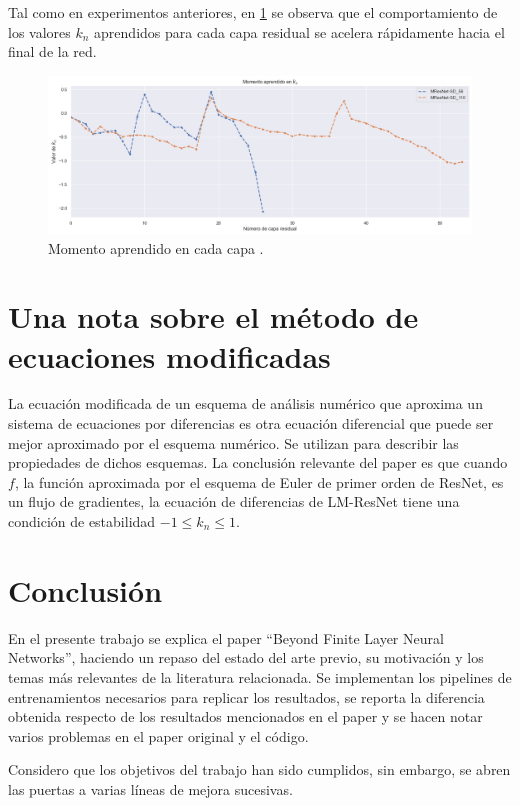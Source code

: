 \documentclass[titlepage,a4paper,oneside]{article}
\begin{document}
Tal como en experimentos anteriores, en \ref{sd_momentum} se observa que el comportamiento de los valores $k_n$ aprendidos para cada capa residual se acelera rápidamente hacia el final de la red.

\begin{figure}[H]
\centering
\includegraphics[width=\textwidth]{images/momentum_sd.png}
\caption{Momento aprendido en cada capa .}
\label{sd_momentum}
\end{figure}

\section{Una nota sobre el método de ecuaciones modificadas}
La ecuación modificada de un esquema de análisis numérico que aproxima un sistema de ecuaciones por diferencias es otra ecuación diferencial que puede ser mejor aproximado por el esquema numérico. Se utilizan para describir las propiedades de dichos esquemas. La conclusión relevante del paper es que cuando $f$, la función aproximada por el esquema de Euler de primer orden de ResNet, es un flujo de gradientes, la ecuación de diferencias de LM-ResNet tiene una condición de estabilidad $-1 \leq k_n \leq 1$.

\section{Conclusión}
En el presente trabajo se explica el paper ``Beyond Finite Layer Neural Networks'', haciendo un repaso del estado del arte previo, su motivación y los temas más relevantes de la literatura relacionada. Se implementan los pipelines de entrenamientos necesarios para replicar los resultados, se reporta la diferencia obtenida respecto de los resultados mencionados en el paper y se hacen notar varios problemas en el paper original y el código.

Considero que los objetivos del trabajo han sido cumplidos, sin embargo, se abren las puertas a varias líneas de mejora sucesivas.
\end{document}
